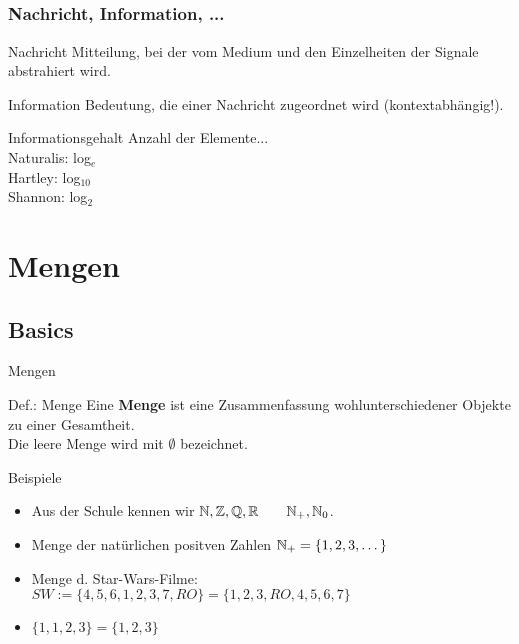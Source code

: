 \subsection{}
	\begin{frame}
		\frametitle{Nachricht, Information, ...}
			\begin{block}{Nachricht}
			      Mitteilung, bei der vom Medium und den Einzelheiten der Signale abstrahiert wird.
			\end{block}
		\pause
			\begin{block}{Information}
		    	  Bedeutung, die einer Nachricht zugeordnet wird (kontextabhängig!).
			\end{block}
		\pause
			\begin{block}{Informationsgehalt}
				Anzahl der Elemente... \\ %
		     	Naturalis: log$_{e}$ \\
		      	Hartley: log$_{10}$ \\
		      	Shannon: log$_{2}$
		\end{block}
	\end{frame}

\section{Mengen}
\subsection{Basics}
	\begin{frame}{Mengen}
		\begin{block}{Def.: Menge}
			Eine \textbf{Menge} ist eine Zusammenfassung wohlunterschiedener Objekte zu einer Gesamtheit.\\
			Die leere Menge wird mit $\emptyset$ bezeichnet.\\
		\end{block}
		\pause
		\begin{exampleblock}{Beispiele}
			\begin{itemize}
				\item Aus der Schule kennen wir \qquad $\mathbb{N}, \mathbb{Z}, \mathbb{Q}, \mathbb{R} \qquad \mathbb{N}_+, \mathbb{N}_0$.
				\item Menge der natürlichen positven Zahlen $\mathbb{N}_+ = \{1,2,3,\dots\}$
				\item Menge d. Star-Wars-Filme: $SW:=\{4,5,6,1,2,3,7,RO\} = \{1,2,3,RO,4,5,6,7\}$
				\item $\{1,1,2,3\} = \{1,2,3\}$
			\end{itemize}
		\end{exampleblock}
	\end{frame}

